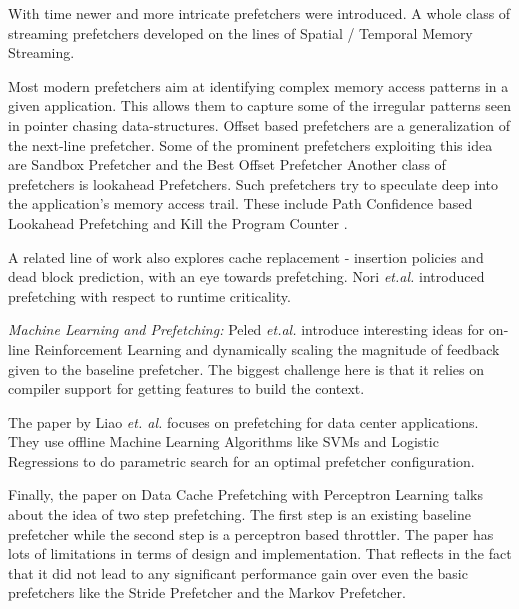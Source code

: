 \documentclass{sig-alternate}
\begin{document}
With time newer and more intricate prefetchers were introduced.
\cite{Wenisch_Temporal_Streaming}
\cite{Stealth}
\cite{Feedback_Directed}
\cite{Coordinated}
\cite{Bandwidth_Efficient}
\cite{Pacman}
\cite{TLB}
\cite{Linearizing}
\cite{Sandbox}
\cite{VLDP}
\cite{DoL}
\cite{Domino}
A whole class of streaming prefetchers developed on the lines of Spatial / Temporal Memory Streaming.
\cite{Spatial_Pattern}
\cite{SMS}
\cite{Temporal_Instruction_Fetch}
\cite{Off_Chip}
\cite{STMS}
\cite{SMS_JILP}

Most modern prefetchers aim at identifying complex memory access patterns in a given application. 
This allows them to capture some of the irregular patterns seen in pointer chasing data-structures.
Offset based prefetchers are a generalization of the next-line prefetcher.
Some of the prominent prefetchers exploiting this idea are
Sandbox Prefetcher \cite{Sandbox}
and the Best Offset Prefetcher \cite{BOP}
Another class of prefetchers is lookahead Prefetchers.
Such prefetchers try to speculate deep into the application's memory access trail.
These include Path Confidence based Lookahead Prefetching \cite{SPP}
and Kill the Program Counter \cite{KPC}.

A related line of work also explores cache replacement - insertion policies and dead block prediction, with an eye towards prefetching. 
\cite{DB_Pred}
\cite{Cache_Burst}
\cite{KPC}
\cite{Harmony}
Nori \textit{et.al.} introduced prefetching with  respect to runtime criticality.
\cite{CATCH}
\newline

\textit{Machine Learning and Prefetching:}
Peled \textit{et.al.} introduce interesting ideas for on-line Reinforcement Learning and dynamically scaling the magnitude of feedback given to the baseline prefetcher.
\cite{Semantics}
The biggest challenge here is that it relies on compiler support for getting features to build the context.

The paper by Liao \textit{et. al.} focuses on prefetching for data center applications.
\cite{Datacenter}
They use offline Machine Learning Algorithms like SVMs and Logistic Regressions to do parametric search for an optimal prefetcher configuration.

Finally, the paper on Data Cache Prefetching with Perceptron Learning\cite{BadPerc} talks about the idea of two step prefetching.
The first step is an existing baseline prefetcher while the second step is a perceptron based throttler.
The paper has lots of limitations in terms of design and implementation.
That reflects in the fact that it did not lead to any significant performance gain over even the basic prefetchers like the Stride Prefetcher\cite{Stride} and the Markov Prefetcher\cite{Markov}.
\end{document}
